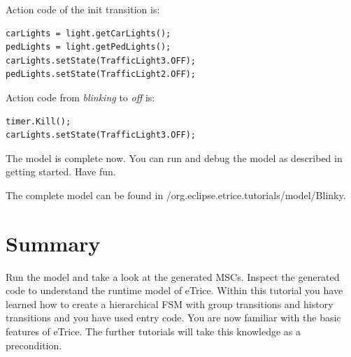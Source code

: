 Action code of the init transition is:

\begin{verbatim}
carLights = light.getCarLights();
pedLights = light.getPedLights();
carLights.setState(TrafficLight3.OFF);
pedLights.setState(TrafficLight2.OFF);
\end{verbatim}

Action code from \textit{blinking} to \textit{off} is:

\begin{verbatim}
timer.Kill();
carLights.setState(TrafficLight3.OFF); 
\end{verbatim}

The model is complete now. You can run and debug the model as described in getting started. Have fun.

The complete model can be found in /org.eclipse.etrice.tutorials/model/Blinky.

\section{Summary}

Run the model and take a look at the generated MSCs. Inspect the generated code to understand the runtime 
model of eTrice. Within this tutorial you have learned how to create a hierarchical FSM with group 
transitions and history transitions and you have used entry code. You are now familiar with the basic 
features of eTrice. The further tutorials will take this knowledge as a precondition.
